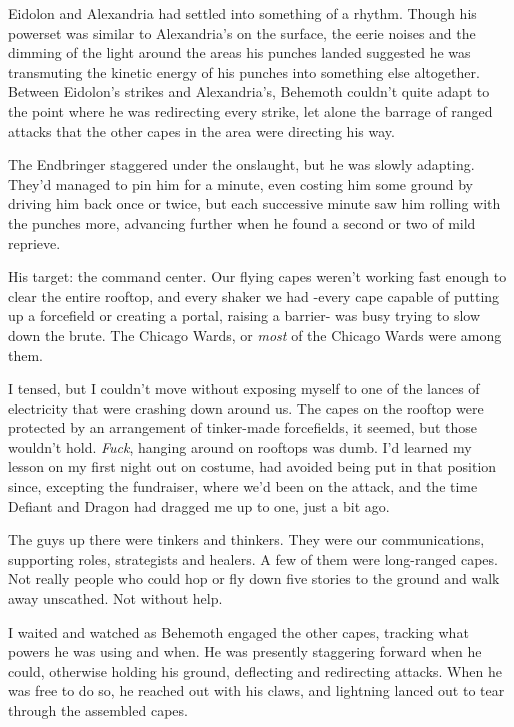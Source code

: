 





Eidolon and Alexandria had settled into something of a rhythm.  Though his powerset was similar to Alexandria's on the surface, the eerie noises and the dimming of the light around the areas his punches landed suggested he was transmuting the kinetic energy of his punches into something else altogether.  Between Eidolon's strikes and Alexandria's, Behemoth couldn't quite adapt to the point where he was redirecting every strike, let alone the barrage of ranged attacks that the other capes in the area were directing his way.



The Endbringer staggered under the onslaught, but he was slowly adapting.  They'd managed to pin him for a minute, even costing him some ground by driving him back once or twice, but each successive minute saw him rolling with the punches more, advancing further when he found a second or two of mild reprieve.



His target: the command center.  Our flying capes weren't working fast enough to clear the entire rooftop, and every shaker we had -every cape capable of putting up a forcefield or creating a portal, raising a barrier- was busy trying to slow down the brute.  The Chicago Wards, or \emph{most} of the Chicago Wards were among them.



I tensed, but I couldn't move without exposing myself to one of the lances of electricity that were crashing down around us.  The capes on the rooftop were protected by an arrangement of tinker-made forcefields, it seemed, but those wouldn't hold.  \emph{Fuck}, hanging around on rooftops was dumb.  I'd learned my lesson on my first night out on costume, had avoided being put in that position since, excepting the fundraiser, where we'd been on the attack, and the time Defiant and Dragon had dragged me up to one, just a bit ago.



The guys up there were tinkers and thinkers.  They were our communications, supporting roles, strategists and healers.  A few of them were long-ranged capes.  Not really people who could hop or fly down five stories to the ground and walk away unscathed.  Not without help.



I waited and watched as Behemoth engaged the other capes, tracking what powers he was using and when.  He was presently staggering forward when he could, otherwise holding his ground, deflecting and redirecting attacks.  When he was free to do so, he reached out with his claws, and lightning lanced out to tear through the assembled capes.



